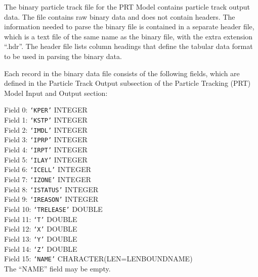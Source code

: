 The binary particle track file for the PRT Model contains particle track output data.  The file
contains raw binary data and does not contain headers.  The information needed to parse the binary
file is contained in a separate header file, which is a text file of the same name as the binary
file, with the extra extension ``.hdr''.  The header file lists column headings that define the
tabular data format to be used in parsing the binary data.

Each record in the binary data file consists of the following fields, which are defined in the
Particle Track Output subsection of the Particle Tracking (PRT) Model Input and Output section:

\vspace{5mm}
\noindent Field 0: \texttt{`KPER'} {\color{red} \footnotesize{INTEGER}} \\
\noindent Field 1: \texttt{`KSTP'} {\color{red} \footnotesize{INTEGER}} \\
\noindent Field 2: \texttt{`IMDL'} {\color{red} \footnotesize{INTEGER}} \\
\noindent Field 3: \texttt{`IPRP'} {\color{red} \footnotesize{INTEGER}} \\
\noindent Field 4: \texttt{`IRPT'} {\color{red} \footnotesize{INTEGER}} \\
\noindent Field 5: \texttt{`ILAY'} {\color{red} \footnotesize{INTEGER}} \\
\noindent Field 6: \texttt{`ICELL'} {\color{red} \footnotesize{INTEGER}} \\
\noindent Field 7: \texttt{`IZONE'} {\color{red} \footnotesize{INTEGER}} \\
\noindent Field 8: \texttt{`ISTATUS'} {\color{red} \footnotesize{INTEGER}} \\
\noindent Field 9: \texttt{`IREASON'} {\color{red} \footnotesize{INTEGER}} \\
\noindent Field 10: \texttt{`TRELEASE'} {\color{red} \footnotesize{DOUBLE}} \\
\noindent Field 11: \texttt{`T'} {\color{red} \footnotesize{DOUBLE}} \\
\noindent Field 12: \texttt{`X'} {\color{red} \footnotesize{DOUBLE}} \\
\noindent Field 13: \texttt{`Y'} {\color{red} \footnotesize{DOUBLE}} \\
\noindent Field 14: \texttt{`Z'} {\color{red} \footnotesize{DOUBLE}} \\
\noindent Field 15: \texttt{`NAME'} {\color{red} \footnotesize{CHARACTER(LEN=LENBOUNDNAME)}} \\

\vspace{4mm}
\noindent The ``NAME'' field may be empty.
